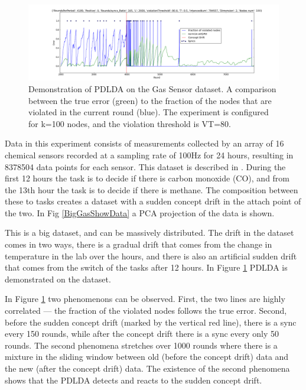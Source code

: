 \documentclass[11pt,twocolumn,varwidth=true,a4paper,fleqn]{article}
\begin{document}
\begin{figure}[ht!]
\centering
\includegraphics[width=\textwidth]{BigGas/overTime100k.png}
\caption{Demonstration of PDLDA on the Gas Sensor dataset. 
A comparison between the true error (green) to the fraction of the nodes that 
are violated in the current round (blue). 
The experiment is configured for k=100 nodes, and the violation threshold is
VT=80.}
\label{BigGasOverTime}
\end{figure}
Data in this experiment consists of measurements collected
by an array of 16 chemical sensors recorded at a sampling
rate of 100Hz for 24 hours, resulting in 8378504 data points for each sensor. 
This dataset is described in \cite{bigGas}.
During the first 12 hours the task is to decide if there is carbon monoxide
(CO), and from the 13th hour the task is to decide if there is methane. 
The composition between these to tasks creates a dataset with a sudden concept
drift in the attach point of the two.  
In Fig \ref{BigGasShowData} a PCA projection of the data is shown.


This is a big dataset, and can be massively distributed. The drift in
the dataset comes in two ways, there is a gradual drift that comes from 
the change in temperature in the lab over the hours, and there is also an
artificial sudden drift that comes from the switch of the tasks after 12 hours.
In Figure \ref{BigGasOverTime} PDLDA is demonstrated on the dataset.

In Figure \ref{BigGasOverTime} two phenomenons can be observed.
First, the two lines are highly correlated --- the fraction of the violated
nodes follows the true error. Second,  before the sudden concept drift 
(marked by the vertical red line), there is a sync every 150 rounds, while 
after the concept drift there is a sync every only 50 rounds.
The second phenomena stretches over 1000 rounds where there is a mixture in the 
sliding window between old (before the concept drift) data and the new 
(after the concept drift) data. The existence of the second phenomena shows that
the PDLDA detects and reacts to the sudden concept drift.
\end{document}
